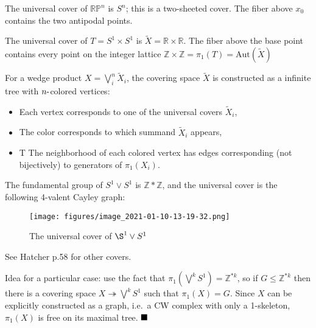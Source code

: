 \begin{example}

The universal cover of \({\mathbb{RP}}^n\) is \(S^n\); this is a
two-sheeted cover. The fiber above \(x_0\) contains the two antipodal
points.

\end{example}

\begin{example}

The universal cover of \(T = S^1 \times S^1\) is
\(\tilde X ={\mathbb{R}}\times{\mathbb{R}}\). The fiber above the base
point contains every point on the integer lattice
\({\mathbb{Z}}\times{\mathbb{Z}}= \pi_1(T) = \text{Aut}(\tilde X)\)

\end{example}

\begin{fact}

For a wedge product \(X = \bigvee_i^n \tilde X_i\), the covering space
\(\tilde X\) is constructed as a infinite tree with
\(n{\hbox{-}}\)colored vertices:

\begin{itemize}
\tightlist
\item
  Each vertex corresponds to one of the universal covers \(\tilde X_i\),
\item
  The color corresponds to which summand \(\tilde X_i\) appears,
\item
  T The neighborhood of each colored vertex has edges corresponding (not
  bijectively) to generators of \(\pi_1(X_i)\).
\end{itemize}

\end{fact}

\begin{example}

The fundamental group of \(S^1 \vee S^1\) is
\({\mathbb{Z}}\ast {\mathbb{Z}}\), and the universal cover is the
following 4-valent Cayley graph:

\begin{figure}
\centering
\texttt{[image: figures/image\_2021-01-10-13-19-32.png]}
\caption{The universal cover of \(\S^1 \vee S^1\)}
\end{figure}

See Hatcher p.58 for other covers.

\end{example}

\begin{corollary}

Idea for a particular case: use the fact that
\(\pi_1(\bigvee^k S^1) = {\mathbb{Z}}^{\ast k}\), so if
\(G \leq {\mathbb{Z}}^{\ast k}\) then there is a covering space
\(X \twoheadrightarrow\bigvee^k S^1\) such that \(\pi_1(X) = G\). Since
\(X\) can be explicitly constructed as a graph, i.e.~a CW complex with
only a 1-skeleton, \(\pi_1(X)\) is free on its maximal tree.
\(\hfill\blacksquare\)

\end{corollary}

